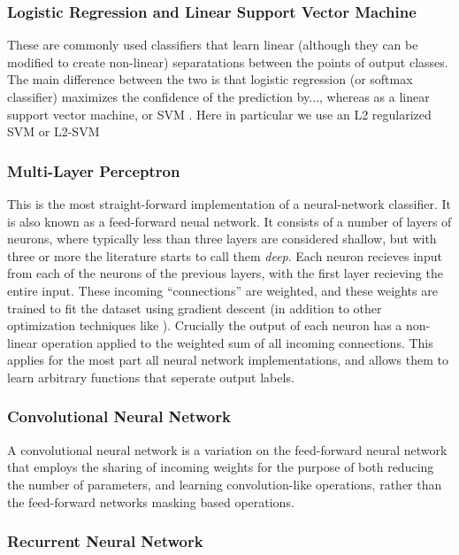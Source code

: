 \documentclass[utf8]{frontiersSCNS} %
\begin{document}
\subsubsection{Logistic Regression and Linear Support Vector Machine}

These are commonly used classifiers that learn linear (although they can be modified to create non-linear) separatations between the points of output classes. The main difference between the two is that logistic regression (or softmax classifier) maximizes the confidence of the prediction by..., whereas as a linear support vector machine, or SVM . Here in particular we use an L2 regularized SVM or L2-SVM

\subsubsection{Multi-Layer Perceptron}

This is the most straight-forward implementation of a neural-network classifier. It is also known as a feed-forward neual network. It consists of a number of layers of neurons, where typically less than three layers are considered shallow, but with three or more the literature starts to call them \textit{deep}. Each neuron recieves input from each of the neurons of the previous layers, with the first layer recieving the entire input. These incoming ``connections'' are weighted, and these weights are trained to fit the dataset using gradient descent (in addition to other optimization techniques like \cite{adam, rmsprop, etc}). Crucially the output of each neuron has a non-linear operation applied to the weighted sum of all incoming connections. This applies for the most part all neural network implementations, and allows them to learn arbitrary functions that seperate output labels.

\subsubsection{Convolutional Neural Network}

A convolutional neural network is a variation on the feed-forward neural network that employs the sharing of incoming weights for the purpose of both reducing the number of parameters, and learning convolution-like operations, rather than the feed-forward networks masking based operations.

\subsubsection{Recurrent Neural Network}
\end{document}

